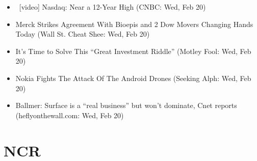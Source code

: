 \documentclass[11pt,asymmetric]{article}
\begin{document}
\begin{itemize}
\item\ [video] Nasdaq: Near a 12-Year High (CNBC: Wed, Feb 20)
\item Merck Strikes Agreement With Bioepis and 2 Dow Movers Changing Hands Today (Wall St. Cheat Shee: Wed, Feb 20)
\item It's Time to Solve This ``Great Investment Riddle'' (Motley Fool: Wed, Feb 20)
\item Nokia Fights The Attack Of The Android Drones (Seeking Alph: Wed, Feb 20)
\item Ballmer: Surface is a ``real business'' but won't dominate, Cnet reports (heflyonthewall.com: Wed, Feb 20)
\end{itemize}

\section*{NCR}
\end{document}
